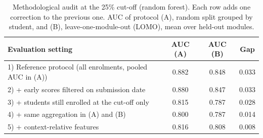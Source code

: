 \begin{table}[t]
\centering
\caption{Methodological audit at the 25\% cut-off (random forest). Each row adds one correction to the previous one. AUC of protocol (A), random split grouped by student, and (B), leave-one-module-out (LOMO), mean over held-out modules.}
\label{tab:audit}
\begin{tabular}{@{}p{4.3cm}ccc@{}}
\toprule
Evaluation setting & AUC (A) & AUC (B) & Gap \\
\midrule
1) Reference protocol (all enrolments, pooled AUC in (A)) & 0.882 & 0.848 & 0.033 \\
2) + early scores filtered on submission date & 0.880 & 0.847 & 0.033 \\
3) + students still enrolled at the cut-off only & 0.815 & 0.787 & 0.028 \\
4) + same aggregation in (A) and (B) & 0.800 & 0.787 & 0.014 \\
5) + context-relative features & 0.816 & 0.808 & 0.008 \\
\bottomrule
\end{tabular}
\end{table}
